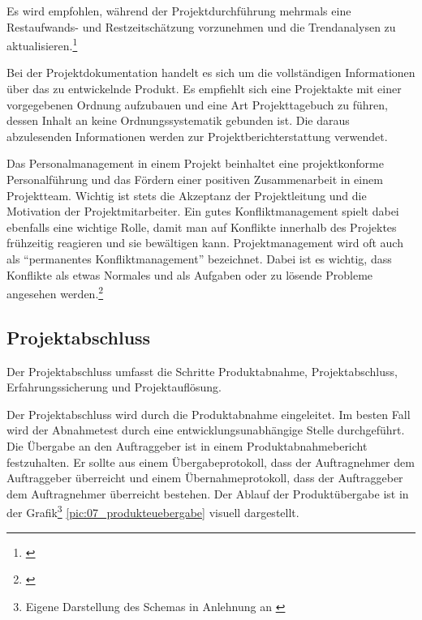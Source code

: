 Es wird empfohlen, während der Projektdurchführung mehrmals eine Restaufwands-
und Restzeitschätzung vorzunehmen und die Trendanalysen zu aktualisieren.\footnote{\citealp*[Vgl.][S. 16]{burghardt2007einfuehrung}}

Bei der Projektdokumentation handelt es sich um die vollständigen Informationen
über das zu entwickelnde Produkt. Es empfiehlt sich eine Projektakte mit einer
vorgegebenen Ordnung aufzubauen und eine Art Projekttagebuch zu führen, dessen
Inhalt an keine Ordnungssystematik gebunden ist. Die daraus abzulesenden
Informationen werden zur Projektberichterstattung verwendet.

Das Personalmanagement in einem Projekt beinhaltet eine projektkonforme
Personalführung und das Fördern einer positiven Zusammenarbeit in einem
Projektteam. Wichtig ist stets die Akzeptanz der Projektleitung und die 
Motivation der Projektmitarbeiter. Ein gutes Konfliktmanagement spielt
dabei ebenfalls eine wichtige Rolle, damit man auf Konflikte innerhalb des
Projektes frühzeitig reagieren und sie bewältigen kann. Projektmanagement
wird oft auch als ``permanentes Konfliktmanagement'' bezeichnet. Dabei ist es
wichtig, dass Konflikte als etwas Normales und als Aufgaben oder zu lösende 
Probleme angesehen werden.\footnote{\citealp*[S. 119]{kessler2004projektmanagement}}

\subsection{Projektabschluss}
Der Projektabschluss umfasst die Schritte Produktabnahme, Projektabschluss,
Erfahrungssicherung und Projektauflösung.

Der Projektabschluss wird durch die Produktabnahme eingeleitet. Im besten Fall
wird der Abnahmetest durch eine entwicklungsunabhängige Stelle durchgeführt.
Die Übergabe an den Auftraggeber ist in einem Produktabnahmebericht festzuhalten.
Er sollte aus einem Übergabeprotokoll, dass der Auftragnehmer dem Auftraggeber
überreicht und einem Übernahmeprotokoll, dass der Auftraggeber dem Auftragnehmer
überreicht bestehen. Der Ablauf der Produktübergabe ist in der Grafik\footnote{Eigene Darstellung des Schemas in Anlehnung an \citealp*[S. 262]{burghardt2007einfuehrung}}
\ref{pic:07_produkteuebergabe} visuell dargestellt.

